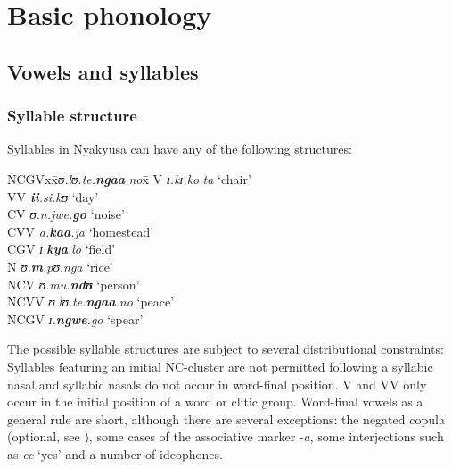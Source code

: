 \section{Basic phonology}\label{BasicPhonology}
\subsection{Vowels and syllables}\label{VowelsAndSyllales} 
\subsubsection{Syllable structure}
Syllables in Nyakyusa can have any of the following structures:
\begin{exe}
		\ex
		\begin{tabbing}
			NCGVx\=x\textit{ʊ.lʊ.te.\textbf{ngaa}.no}x\=\kill%
			V \> \textit{\textbf{ɪ}.kɪ.ko.ta}\> `chair' \\
			VV \> \textit{\textbf{ii}.si.kʊ}\> `day' \\
			CV \> \textit{ʊ.n.jwe.\textbf{go}}\> `noise' \\
			CVV \> \textit{a.\textbf{kaa}.ja}\> `homestead' \\
			CGV \> \textit{ɪ.\textbf{kya}.lo}\> `field' \\
			N\> \textit{ʊ.\textbf{m}.pʊ.nga}\> `rice'\\
			NCV \> \textit{ʊ.mu.\textbf{ndʊ}}\> `person' \\
			NCVV \> \textit{ʊ.lʊ.te.\textbf{ngaa}.no}\> `peace' \\		
			NCGV \> \textit{ɪ.\textbf{ngwe}.go}\> `spear'
		\end{tabbing}
\end{exe}

The possible syllable structures are subject to several distributional constraints: Syllables featuring an initial NC-cluster are not permitted following a syllabic nasal and syllabic nasals do not occur in word-final position. V and VV only occur in the initial position of a word or clitic group. Word-final vowels as a general rule are short, although there are several exceptions: the negated copula (optional, see ), some cases of the associative marker -\textit{a}, some interjections such as \textit{ee} `yes' and a number of ideophones.

